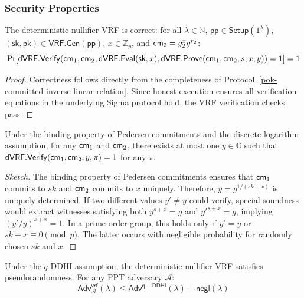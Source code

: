 \subsubsection{Security Properties}

\begin{theorem}[Correctness]
The deterministic nullifier VRF is correct: for all $\lambda \in \mathbb{N}$, $\mathsf{pp} \in \mathsf{Setup}(1^\lambda)$, $(\mathsf{sk}, \mathsf{pk}) \in \mathsf{VRF.Gen}(\mathsf{pp})$, $x \in \mathbb{Z}_p$, and $\mathsf{cm}_2 = g_2^{x} g^{r_2}$:
\[
\Pr[\mathsf{dVRF.Verify}(\mathsf{cm}_1, \mathsf{cm}_2, \mathsf{dVRF.Eval}(\mathsf{sk}, x), \mathsf{dVRF.Prove}(\mathsf{cm}_1, \mathsf{cm}_2, s, x, y)) = 1] = 1
\]
\end{theorem}

\begin{proof}
Correctness follows directly from the completeness of Protocol~\ref{pok-committed-inverse-linear-relation}. Since honest execution ensures all verification equations in the underlying Sigma protocol hold, the VRF verification checks pass.
\end{proof}

\begin{theorem}[Uniqueness]
Under the binding property of Pedersen commitments and the discrete logarithm assumption, for any $\mathsf{cm}_1$ and $\mathsf{cm}_2$, there exists at most one $y \in \mathbb{G}$ such that $\mathsf{dVRF.Verify}(\mathsf{cm}_1, \mathsf{cm}_2, y, \pi) = 1$ for any $\pi$.
\end{theorem}

\begin{proof}[Sketch]
The binding property of Pedersen commitments ensures that $\mathsf{cm}_1$ commits to $sk$ and $\mathsf{cm}_2$ commits to $x$ uniquely. Therefore, $y = g^{1/(sk + x)}$ is uniquely determined. If two different values $y' \neq y$ could verify, special soundness would extract witnesses satisfying both $y^{s+x} = g$ and $y'^{s+x} = g$, implying $(y'/y)^{s+x} = 1$. In a prime-order group, this holds only if $y' = y$ or $sk + x \equiv 0 \pmod{p}$. The latter occurs with negligible probability for randomly chosen $sk$ and $x$.
\end{proof}

\begin{theorem}[Pseudorandomness]
Under the $q$-DDHI assumption, the deterministic nullifier VRF satisfies pseudorandomness. For any PPT adversary $\mathcal{A}$:
\[
\mathsf{Adv}^{\mathsf{vrf}}_{\mathcal{A}}(\lambda) \leq \mathsf{Adv}^{\mathsf{q-DDHI}}(\lambda) + \mathsf{negl}(\lambda)
\]
\end{theorem}

